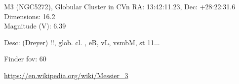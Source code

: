 \begin{block}{M3 (NGC5272), Globular Cluster in CVn}
    RA: 13:42:11.23, Dec: +28:22:31.6 \\ 
    Dimensions: 16.2 \\ 
    Magnitude (V): 6.39


    Desc: (Dreyer) !!, glob. cl. , eB, vL, vsmbM, st 11... 

    Finder fov: 60 

    \url{https://en.wikipedia.org/wiki/Messier_3} 
\end{block}